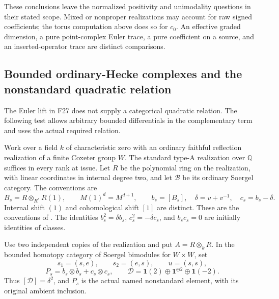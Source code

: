 \documentclass[11pt,a4paper]{article}
\newcommand{\mathscr}{\mathcal}
\renewcommand{\S}{\ensuremath{\mathsection}}
\newcommand{\fid}[1]{\textsf{#1}}\newcommand{\gate}[1]{\textsf{#1}}
\theoremstyle{named}\newtheorem{finding}{Finding}[section]
\theoremstyle{definition}\newtheorem{definition}[finding]{Definition}
\theoremstyle{remark}\newtheorem{remark}[finding]{Remark}
\begin{document}
These conclusions leave the normalized positivity
and unimodality questions in their stated scope.
Mixed or nonproper realizations may account for raw
signed coefficients; the torus computation above
does so for \(c_0\).
An effective graded dimension, a pure point-complex
Euler trace, a pure coefficient on a source, and an
inserted-operator trace are distinct comparisons.

\subsection{Bounded ordinary-Hecke complexes and the nonstandard quadratic relation}

The Euler lift in \fid{F27} does not supply a categorical quadratic
relation. The following test allows arbitrary bounded differentials in
the complementary term and uses the actual required relation.

Work over a field \(k\) of characteristic zero with an ordinary faithful
reflection realization of a finite Coxeter group \(W\). The standard
type-A realization over \(\mathbb Q\) suffices in every rank at issue.
Let \(R\) be the polynomial ring on the realization, with linear
coordinates in internal degree two, and let \(\mathcal B\) be its
ordinary Soergel category. The conventions are
\[
 B_s=R\otimes_{R^s}R(1),\qquad
 M(1)^d=M^{d+1},\qquad b_s=[B_s],\quad
 \delta=v+v^{-1},\quad c_s=b_s-\delta.
\]
Internal shift \((1)\) and cohomological shift \([1]\) are distinct.
These are the conventions of \cite[\S\S3.3--3.5,
pp.~1105--1108]{EW}. The identities
\(b_s^2=\delta b_s\), \(c_s^2=-\delta c_s\), and
\(b_sc_s=0\) are initially identities of classes.

Use two independent copies of the realization and put
\(A=R\otimes_kR\). In the bounded homotopy category of
Soergel bimodules for \(W\times W\), set
\[
 s_1=(s,e),\qquad s_2=(e,s),\qquad u=(s,s),
\]
\[
 P_s=b_s\otimes b_s+c_s\otimes c_s,
 \qquad
 \mathscr D=\mathbf1(2)\oplus\mathbf1^{\oplus2}
                        \oplus\mathbf1(-2).
\]
Thus \([\mathscr D]=\delta^2\), and \(P_s\) is the actual
named nonstandard element, with its original ambient inclusion.
\end{document}
